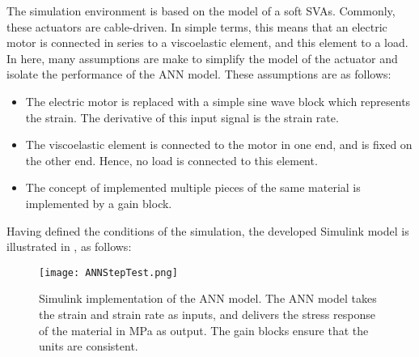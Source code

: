 The simulation environment is based on the model of a soft SVAs. Commonly, these actuators are cable-driven. In simple terms, this means that an electric motor is connected in series to a viscoelastic element, and this element to a load. In here, many assumptions are make to simplify the model of the actuator and isolate the performance of the ANN model. These assumptions are as follows:

\begin{itemize}
	\item The electric motor is replaced with a simple sine wave block which represents the strain. The derivative of this input signal is the strain rate.	
	\item The viscoelastic element is connected to the motor in one end, and is fixed on the other end. Hence, no load is connected to this element.
	\item The concept of implemented multiple pieces of the same material is implemented by a gain block.
\end{itemize}

Having defined the conditions of the simulation, the developed Simulink model is illustrated in , as follows:

\begin{figure}[hbtp!]
    \centering
    \texttt{[image: ANNStepTest.png]}
    \caption{ Simulink implementation of the ANN model. The ANN model takes the strain and strain rate as inputs, and delivers the stress response of the material in MPa as output. The gain blocks ensure that the units are consistent. }
    \label{fig:ANNStepTest}
\end{figure}

\newpage

